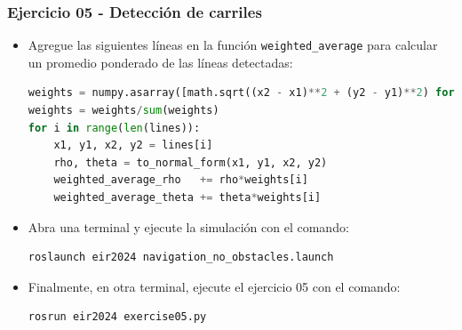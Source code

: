 \begin{frame}[containsverbatim]\frametitle{Ejercicio 05 - Detección de carriles}
  \begin{itemize}
    \setcounter{enumi}{4}
  \item Agregue las siguientes líneas en la función \texttt{weighted\_average} para calcular un promedio ponderado de las líneas detectadas:
    \begin{lstlisting}[language=Python,firstnumber=100]
weights = numpy.asarray([math.sqrt((x2 - x1)**2 + (y2 - y1)**2) for x1, y1, x2, y2 in lines])
weights = weights/sum(weights)
for i in range(len(lines)):
    x1, y1, x2, y2 = lines[i]
    rho, theta = to_normal_form(x1, y1, x2, y2)
    weighted_average_rho   += rho*weights[i]
    weighted_average_theta += theta*weights[i]
    \end{lstlisting}
  \item Abra una terminal y ejecute la simulación con el comando:
    \begin{lstlisting}[language=bash,numbers=none]
roslaunch eir2024 navigation_no_obstacles.launch
    \end{lstlisting}
  \item Finalmente, en otra terminal, ejecute el ejercicio 05 con el comando:
    \begin{lstlisting}[language=bash,numbers=none]
rosrun eir2024 exercise05.py
    \end{lstlisting}
  \end{itemize}
\end{frame}

